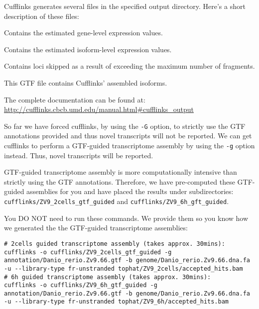 \begin{information}
Cufflinks generates several files in the specified output directory. Here's a short description of these files:

\begin{description}[style=multiline,labelindent=0cm,align=right,leftmargin=\descriptionlabelspace,rightmargin=1.5cm,font=\ttfamily]
\item[genes.fpkm\_tracking] Contains the estimated gene-level expression values.
\item[isoforms.fpkm\_tracking] Contains the estimated isoform-level expression values.
\item[skipped.gtf] Contains loci skipped as a result of exceeding the maximum number of fragments.
\item[transcripts.gtf] This GTF file contains Cufflinks' assembled isoforms.
\end{description}

The complete documentation can be found at:
\url{http://cufflinks.cbcb.umd.edu/manual.html#cufflinks_output}
\end{information}

\begin{information}
So far we have forced cufflinks, by using the \texttt{-G} option, to strictly
use the GTF annotations provided and thus novel transcripts will not be reported. We
can get cufflinks to perform a GTF-guided transcriptome assembly by using the
\texttt{-g} option instead. Thus, novel transcripts will be reported.

\end{information}

\begin{warning}
GTF-guided transcriptome assembly is more computationally intensive than
strictly using the GTF annotations. Therefore, we have pre-computed these
GTF-guided assemblies for you and have placed the results under subdirectories:
\texttt{cufflinks/ZV9\_2cells\_gtf\_guided} and
\texttt{cufflinks/ZV9\_6h\_gft\_guided}.

You DO NOT need to run these commands. We provide them so you know how we
generated the the GTF-guided transcriptome assemblies:
\begin{lstlisting}
# 2cells guided transcriptome assembly (takes approx. 30mins):
cufflinks -o cufflinks/ZV9_2cells_gtf_guided -g annotation/Danio_rerio.Zv9.66.gtf -b genome/Danio_rerio.Zv9.66.dna.fa -u --library-type fr-unstranded tophat/ZV9_2cells/accepted_hits.bam
# 6h guided transcriptome assembly (takes approx. 30mins):
cufflinks -o cufflinks/ZV9_6h_gtf_guided -g annotation/Danio_rerio.Zv9.66.gtf -b genome/Danio_rerio.Zv9.66.dna.fa -u --library-type fr-unstranded tophat/ZV9_6h/accepted_hits.bam
\end{lstlisting}

\end{warning}

